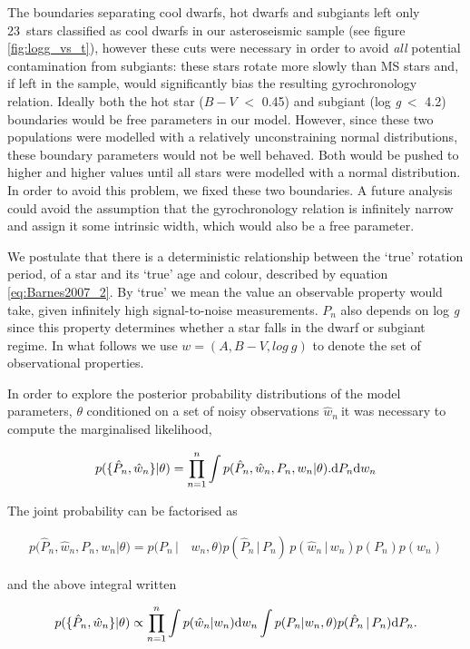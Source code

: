 \documentclass[10pt,preprint]{aastex}
\newcommand{\logg}{log \emph{g}}
\newcommand{\wh}{$\hat{w}_n$}
\newcommand{\ncooldwarfs}{23~}
\begin{document}
The boundaries separating cool dwarfs, hot dwarfs and subgiants left only \ncooldwarfs stars classified as cool dwarfs in our asteroseismic sample (see figure \ref{fig:logg_vs_t}), however these cuts were necessary in order to avoid {\it all} potential contamination from subgiants: these stars rotate more slowly than MS stars and, if left in the sample, would significantly bias the resulting gyrochronology relation.
Ideally both the hot star ($B-V$ $<$ 0.45) and subgiant (\logg$~<$ 4.2) boundaries would be free parameters in our model.
However, since these two populations were modelled with a relatively unconstraining normal distributions, these boundary parameters would not be well behaved.
Both would be pushed to higher and higher values until all stars were modelled with a normal distribution.
In order to avoid this problem, we fixed these two boundaries.
A future analysis could avoid the assumption that the gyrochronology relation is infinitely narrow and assign it some intrinsic width, which would also be a free parameter.

We postulate that there is a deterministic relationship between the `true' rotation period, of a star and its `true' age and colour, described by equation \ref{eq:Barnes2007_2}.
By `true' we mean the value an observable property would take, given infinitely high signal-to-noise measurements.
$P_n$ also depends on \logg$~$since this property determines whether a star falls in the dwarf or subgiant regime.
In what follows we use $w = (A, B-V, log~g)$ to denote the set of observational properties.

In order to explore the posterior probability distributions of the model parameters, $\theta$ conditioned on a set of noisy observations \wh$~$it was necessary to compute the marginalised likelihood,

\begin{equation}
	p(\{\hat{P}_n,\hat{w}_n\}|\theta) =
	\prod_{n=1}^{n} \int p(\hat{P}_n,\hat{w}_n,P_n,w_n|\theta).
	{\rm d}P_n {\rm d}w_n
\label{eq:fulll}
\end{equation}

The joint probability can be factorised as

\begin{align}
	p(\hat{P}_n,\hat{w}_n,P_n,w_n|\theta) = p(P_n\,| & \,w_n,\theta) p(\hat{P}_n\,|\,P_n)\,p(\hat{w}_n\,|\,w_n) p(P_n)p(w_n)
\nonumber
\end{align}

and the above integral written

\begin{equation}
	p(\{\hat{P}_n,\hat{w}_n\}|\theta) \propto
	\prod_{n=1}^{n} \int p(\hat{w}_n|w_n) {\rm d}w_n \int p(P_n|w_n,\theta) p(\hat{P}_n\,|\,P_n) {\rm d}P_n.
\label{eq:fac}
\end{equation}
\end{document}
